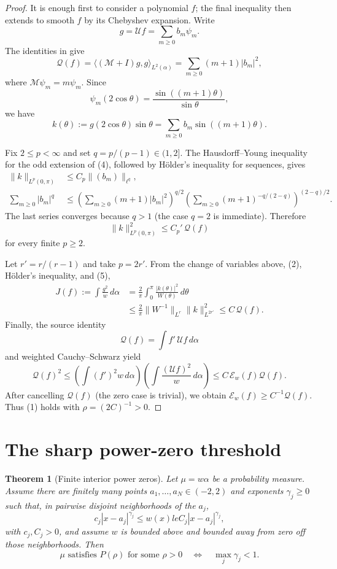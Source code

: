 \documentclass[11pt]{article}
\newtheorem{theorem}{Theorem}
\newcommand{\Qf}{\mathcal{Q}}
\newcommand{\E}{\mathcal{E}}
\begin{document}
\begin{proof}
It is enough first to consider a polynomial $f$; the final inequality then
extends to smooth $f$ by its Chebyshev expansion. Write
\[
 g=\mathcal U f=\sum_{m\ge0}b_m\psi_m.
\]
The identities in \cite{LP} give
\[
 \Qf(f)=\langle(\mathcal M+I)g,g\rangle_{L^2(\alpha)}
         =\sum_{m\ge0}(m+1)|b_m|^2,                           \tag{3}
\]
where $\mathcal M\psi_m=m\psi_m$. Since
\[
 \psi_m(2\cos\theta)=\frac{\sin((m+1)\theta)}{\sin\theta},
\]
we have
\[
 k(\theta):=g(2\cos\theta)\sin\theta
     =\sum_{m\ge0}b_m\sin((m+1)\theta).                      \tag{4}
\]

Fix $2\le p<\infty$ and set $q=p/(p-1)\in(1,2]$. The
Hausdorff--Young inequality for the odd extension of (4), followed by
H\"older's inequality for sequences, gives
\begin{align*}
 \|k\|_{L^p(0,\pi)}&\le C_p\|(b_m)\|_{\ell^q},\\
 \sum_{m\ge0}|b_m|^q
 &\le
 \left(\sum_{m\ge0}(m+1)|b_m|^2\right)^{q/2}
 \left(\sum_{m\ge0}(m+1)^{-q/(2-q)}\right)^{(2-q)/2}.
\end{align*}
The last series converges because $q>1$ (the case $q=2$ is immediate).
Therefore
\[
 \|k\|_{L^p(0,\pi)}^2\le C_p'\,\Qf(f)                       \tag{5}
\]
for every finite $p\ge2$.

Let $r'=r/(r-1)$ and take $p=2r'$. From the change of variables above,
(2), H\"older's inequality, and (5),
\begin{align*}
 J(f):=\int\frac{g^2}{w}\,d\alpha
 &=\frac{2}{\pi}\int_0^\pi\frac{|k(\theta)|^2}{W(\theta)}\,d\theta\\
 &\le \frac{2}{\pi}\|W^{-1}\|_{L^r}
       \|k\|_{L^{2r'}}^2
 \le C\,\Qf(f).                                             \tag{6}
\end{align*}
Finally, the source identity
\[
 \Qf(f)=\int f'\,\mathcal U f\,d\alpha
\]
and weighted Cauchy--Schwarz yield
\[
 \Qf(f)^2
 \le \left(\int(f')^2w\,d\alpha\right)
      \left(\int\frac{(\mathcal U f)^2}{w}\,d\alpha\right)
 \le C\,\E_w(f)\Qf(f).
\]
After cancelling $\Qf(f)$ (the zero case is trivial), we obtain
$\E_w(f)\ge C^{-1}\Qf(f)$. Thus (1) holds with
$\rho=(2C)^{-1}>0$.
\end{proof}

\section{The sharp power-zero threshold}

\begin{theorem}[Finite interior power zeros]\label{thm:sharp}
Let $\mu=w\alpha$ be a probability measure. Assume there are finitely many
points $a_1,\dots,a_N\in(-2,2)$ and exponents $\gamma_j\ge0$ such that,
in pairwise disjoint neighborhoods of the $a_j$,
\[
 c_j|x-a_j|^{\gamma_j}\le w(x)le
 C_j|x-a_j|^{\gamma_j},                                     \tag{7}
\]
with $c_j,C_j>0$, and assume $w$ is bounded above and bounded away from zero
off those neighborhoods. Then
\[
 \mu\text{ satisfies }P(\rho)\text{ for some }\rho>0
 \quad\Longleftrightarrow\quad
 \max_j\gamma_j<1.                                         \tag{8}
\]
\end{theorem}
\end{document}
